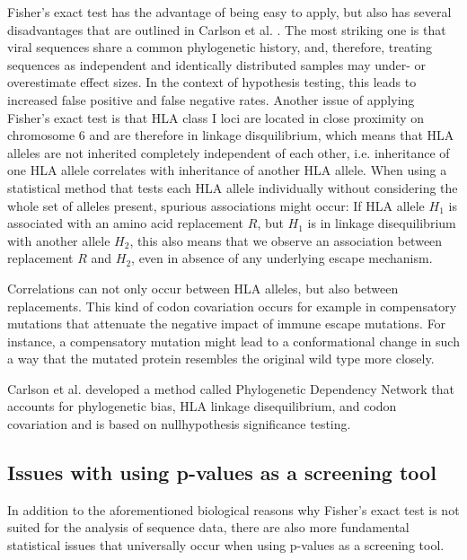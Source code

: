 \documentclass[fleqn,11pt]{SelfArx} %
\begin{document}
Fisher's exact test has the advantage of being easy to apply\nolinebreak\cite{Budeus2016}, 
but also has several disadvantages that are outlined in Carlson et al. 
\nolinebreak\cite{Carlson2008}.
The most striking one is that viral sequences share a common phylogenetic history, and, 
therefore, treating sequences as independent and identically distributed samples may under- or
overestimate effect sizes. In the context of hypothesis testing, this leads to
increased false positive and false negative rates.
Another issue of applying Fisher's exact test is that HLA class I loci are located in
close proximity on chromosome 6 and are therefore in linkage disquilibrium, which means 
that HLA alleles are not inherited completely independent of each other, i.e.
inheritance of one HLA allele correlates with inheritance of another HLA allele.
When using a statistical method that tests each HLA allele individually without
considering the whole set of alleles present, spurious associations might occur: 
If HLA allele \(H_{1}\) is associated with an amino acid replacement \(R\), but
\(H_{1}\) is in linkage disequilibrium with another allele \(H_{2}\), this also means that
we observe an association between replacement \(R\) and \(H_{2}\), even in
absence of any underlying escape mechanism.

Correlations can not only occur between HLA alleles, but also between replacements.
This kind of codon covariation occurs for example in compensatory mutations that
attenuate the negative impact of immune escape mutations. For instance,
a compensatory mutation might lead to a conformational change in such a way that
the mutated protein resembles the original wild type more closely.

Carlson et al. \nolinebreak\cite{Carlson2008} developed a method called 
Phylogenetic Dependency Network that accounts for phylogenetic bias, 
HLA linkage disequilibrium, and codon covariation and is based on 
nullhypothesis significance testing.

\subsection{Issues with using p-values as a screening tool}

In addition to the aforementioned biological reasons why Fisher's exact test is 
not suited for the analysis of sequence data, there are also more fundamental statistical
issues that universally occur when using p-values as a screening tool\nolinebreak\cite{Amrhein2017}.
\end{document}
